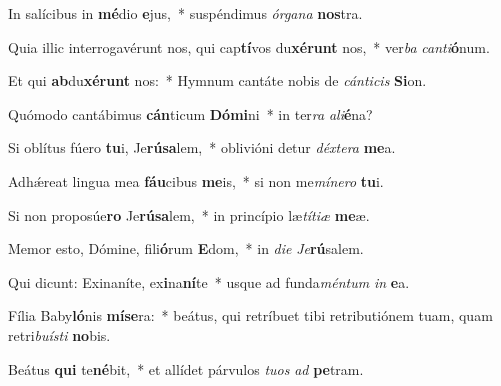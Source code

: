 \item In salícibus in \textbf{mé}dio \textbf{e}jus,~* suspéndimus \textit{ór}\textit{ga}\textit{na} \textbf{nos}tra.
\item Quia illic interrogavérunt nos, qui cap\textbf{tí}vos du\textbf{xé}\textbf{runt} nos,~* ver\textit{ba} \textit{can}\textit{ti}\textbf{ó}num.
\item Et qui \textbf{ab}du\textbf{xé}\textbf{runt} nos:~* Hymnum cantáte nobis de \textit{cán}\textit{ti}\textit{cis} \textbf{Si}on.
\item Quómodo cantábimus \textbf{cán}ticum \textbf{Dó}\textbf{mi}ni~* in ter\textit{ra} \textit{a}\textit{li}\textbf{é}na?
\item Si oblítus fúero \textbf{tu}i, Je\textbf{rú}\textbf{sa}lem,~* oblivióni detur \textit{déx}\textit{te}\textit{ra} \textbf{me}a.
\item Adhǽreat lingua mea \textbf{fáu}cibus \textbf{me}is,~* si non me\textit{mí}\textit{ne}\textit{ro} \textbf{tu}i.
\item Si non proposúe\textbf{ro} Je\textbf{rú}\textbf{sa}lem,~* in princípio læ\textit{tí}\textit{ti}\textit{æ} \textbf{me}æ.
\item Memor esto, Dómine, fili\textbf{ó}rum \textbf{E}dom,~* in \textit{di}\textit{e} \textit{Je}\textbf{rú}salem.
\item Qui dicunt: Exinaníte, ex\textbf{i}na\textbf{ní}te~* usque ad funda\textit{mén}\textit{tum} \textit{in} \textbf{e}a.
\item Fília Baby\textbf{ló}nis \textbf{mí}\textbf{se}ra:~* beátus, qui retríbuet tibi retributiónem tuam, quam retri\textit{bu}\textit{ís}\textit{ti} \textbf{no}bis.
\item Beátus \textbf{qui} te\textbf{né}bit,~* et allídet párvulos \textit{tu}\textit{os} \textit{ad} \textbf{pe}tram.
